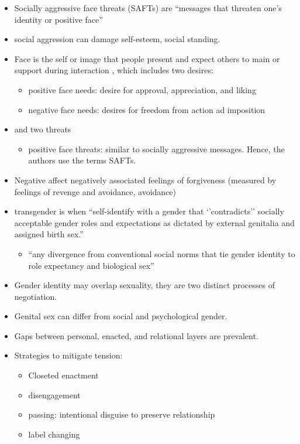 \documentclass[
]{book}
\providecommand{\tightlist}{%
  \setlength{\itemsep}{0pt}\setlength{\parskip}{0pt}}
\begin{document}
\citep{WILLER_2010}

\begin{itemize}
\item
  Socially aggressive face threats (SAFTs) are ``messages that threaten one's identity or positive face''
\item
  social aggression can damage self-esteem, social standing.
\item
  Face is the self or image that people present and expect others to main or support during interaction
  \citep{Cupach_1994}, which includes two desires:

  \begin{itemize}
  \item
    positive face needs: desire for approval, appreciation, and liking
  \item
    negative face needs: desires for freedom from action ad imposition
  \end{itemize}
\item
  and two threats

  \begin{itemize}
  \tightlist
  \item
    positive face threats: similar to socially aggressive messages. Hence, the authors use the terms SAFTs.
  \end{itemize}
\item
  Negative affect negatively associated feelings of forgiveness (measured by feelings of revenge and avoidance,
  avoidance)
\end{itemize}

\citep{Nuru_2014}

\begin{itemize}
\item
  transgender is when ``self-identify with a gender that `'contradicts'' socially acceptable gender roles and
  expectations as dictated by external genitalia and assigned birth sex.''

  \begin{itemize}
  \tightlist
  \item
    ``any divergence from conventional social norms that tie gender identity to role expectancy and biological sex''
    \citep{Bornstein_2013}
  \end{itemize}
\item
  Gender identity may overlap sexuality, they are two distinct processes of negotiation.
\item
  Genital sex can differ from social and psychological gender.
\item
  Gaps between personal, enacted, and relational layers are prevalent.
\item
  Strategies to mitigate tension:

  \begin{itemize}
  \item
    Closeted enactment
  \item
    disengagement
  \item
    passing: intentional disguise to preserve relationship
  \item
    label changing
  \end{itemize}
\end{itemize}
\end{document}
